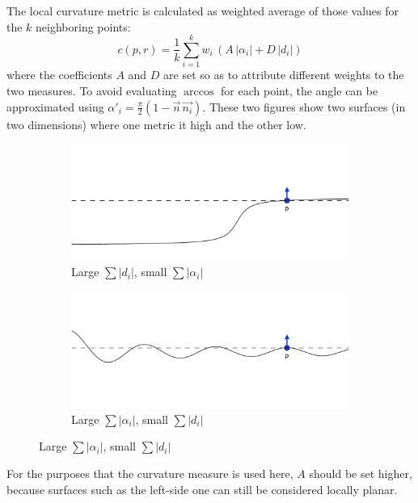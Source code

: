 The local curvature metric is calculated as weighted average of those values for the $k$ neighboring points:
\begin{equation}
c(p, r) = \frac{1}{k} \sum_{i=1}^{k} w_i \, \left( A \, |\alpha_i| + D \, |d_i| \right)
\end{equation}
where the coefficients $A$ and $D$ are set so as to attribute different weights to the two measures. To avoid evaluating $\arccos$ for each point, the angle can be approximated using $\alpha'_i = \frac{\pi}{2} (1 - \vec{n} \, \vec{n_i})$. These two figures show two surfaces (in two dimensions) where one metric it high and the other low.
\begin{figure}[H]
\centering
\begin{subfigure}{.4\textwidth}
	\includegraphics[width=\linewidth]{fig/curvature_distances.pdf}
	\caption{Large $\sum |d_i|$, small $\sum |\alpha_i|$}
\end{subfigure}%
\hspace{15mm}%
\begin{subfigure}{.4\textwidth}
	\includegraphics[width=\linewidth]{fig/curvature_angles.pdf}
	\caption{Large $\sum |\alpha_i|$, small $\sum |d_i|$}
\end{subfigure}	
\end{figure}
For the purposes that the curvature measure is used here, $A$ should be set higher, because surfaces such as the left-side one can still be considered locally planar.

